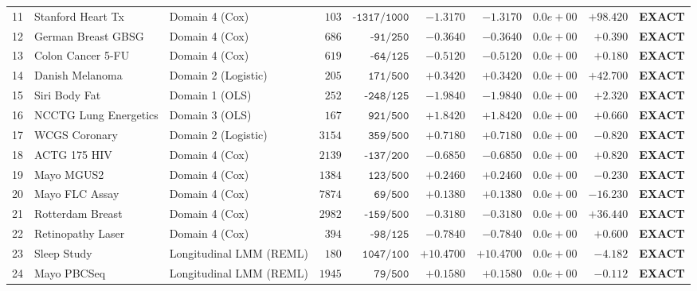 \begin{table}[!t]
{\begin{tabular}{@{}r l l r r r r r r c@{}}
11 & Stanford Heart Tx & Domain 4 (Cox) & $103$ & $\texttt{-1317/1000}$ & $\bm{-1.3170}$ & $\bm{-1.3170}$ & $0.0e+00$ & $+98.420$ & \textbf{EXACT} \\
12 & German Breast GBSG & Domain 4 (Cox) & $686$ & $\texttt{-91/250}$ & $\bm{-0.3640}$ & $\bm{-0.3640}$ & $0.0e+00$ & $+0.390$ & \textbf{EXACT} \\
13 & Colon Cancer 5-FU & Domain 4 (Cox) & $619$ & $\texttt{-64/125}$ & $\bm{-0.5120}$ & $\bm{-0.5120}$ & $0.0e+00$ & $+0.180$ & \textbf{EXACT} \\
14 & Danish Melanoma & Domain 2 (Logistic) & $205$ & $\texttt{171/500}$ & $\bm{+0.3420}$ & $\bm{+0.3420}$ & $0.0e+00$ & $+42.700$ & \textbf{EXACT} \\
15 & Siri Body Fat & Domain 1 (OLS) & $252$ & $\texttt{-248/125}$ & $\bm{-1.9840}$ & $\bm{-1.9840}$ & $0.0e+00$ & $+2.320$ & \textbf{EXACT} \\
16 & NCCTG Lung Energetics & Domain 3 (OLS) & $167$ & $\texttt{921/500}$ & $\bm{+1.8420}$ & $\bm{+1.8420}$ & $0.0e+00$ & $+0.660$ & \textbf{EXACT} \\
17 & WCGS Coronary & Domain 2 (Logistic) & $3154$ & $\texttt{359/500}$ & $\bm{+0.7180}$ & $\bm{+0.7180}$ & $0.0e+00$ & $-0.820$ & \textbf{EXACT} \\
18 & ACTG 175 HIV & Domain 4 (Cox) & $2139$ & $\texttt{-137/200}$ & $\bm{-0.6850}$ & $\bm{-0.6850}$ & $0.0e+00$ & $+0.820$ & \textbf{EXACT} \\
19 & Mayo MGUS2 & Domain 4 (Cox) & $1384$ & $\texttt{123/500}$ & $\bm{+0.2460}$ & $\bm{+0.2460}$ & $0.0e+00$ & $-0.230$ & \textbf{EXACT} \\
20 & Mayo FLC Assay & Domain 4 (Cox) & $7874$ & $\texttt{69/500}$ & $\bm{+0.1380}$ & $\bm{+0.1380}$ & $0.0e+00$ & $-16.230$ & \textbf{EXACT} \\
21 & Rotterdam Breast & Domain 4 (Cox) & $2982$ & $\texttt{-159/500}$ & $\bm{-0.3180}$ & $\bm{-0.3180}$ & $0.0e+00$ & $+36.440$ & \textbf{EXACT} \\
22 & Retinopathy Laser & Domain 4 (Cox) & $394$ & $\texttt{-98/125}$ & $\bm{-0.7840}$ & $\bm{-0.7840}$ & $0.0e+00$ & $+0.600$ & \textbf{EXACT} \\
23 & Sleep Study & Longitudinal LMM (REML) & $180$ & $\texttt{1047/100}$ & $\bm{+10.4700}$ & $\bm{+10.4700}$ & $0.0e+00$ & $-4.182$ & \textbf{EXACT} \\
24 & Mayo PBCSeq & Longitudinal LMM (REML) & $1945$ & $\texttt{79/500}$ & $\bm{+0.1580}$ & $\bm{+0.1580}$ & $0.0e+00$ & $-0.112$ & \textbf{EXACT} \\

\end{tabular}}
\end{table}
